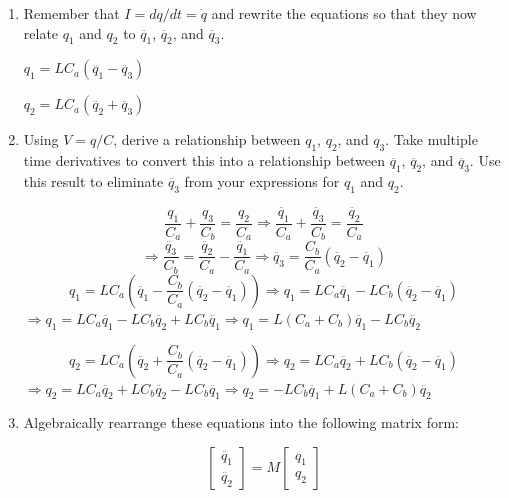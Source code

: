 \documentclass[fleqn]{article}
\makeatletter
\newenvironment{equationCenter}{\@fleqnfalse\begin{equation*}}{\end{equation*}}
\makeatother
\begin{document}
\begin{enumerate}[nolistsep]
\begin{enumerate}[nolistsep]
				\item Remember that $I=dq/dt=\dot{q}$ and rewrite the equations so that they now relate $q_1$ and $q_2$ to $\ddot{q_1}$, $\ddot{q_2}$, and $\ddot{q_3}$.
				
					$q_1 = LC_a(\ddot{q_1} - \ddot{q_3})$
					
					$q_2 = LC_a(\ddot{q_2} + \ddot{q_3})$
					
				\item Using $V=q/C$, derive a relationship between $q_1$, $q_2$, and $q_3$. Take multiple time derivatives to convert this into a relationship between $\ddot{q_1}$, $\ddot{q_2}$, and $\ddot{q_3}$. Use this result to eliminate $\ddot{q_3}$ from your expressions for $q_1$ and $q_2$.
				
					\begin{equation*}
						\frac{q_1}{C_a} + \frac{q_3}{C_b} = \frac{q_2}{C_a} \Rightarrow \frac{\ddot{q_1}}{C_a} + \frac{\ddot{q_3}}{C_b} = \frac{\ddot{q_2}}{C_a}
					\end{equation*}
					\begin{equation*}
						 \Rightarrow \frac{\ddot{q_3}}{C_b} = \frac{\ddot{q_2}}{C_a} - \frac{\ddot{q_1}}{C_a} \Rightarrow \ddot{q_3} = \frac{C_b}{C_a}(\ddot{q_2} - \ddot{q_1})
					\end{equation*}
					\begin{equation*}
						q_1 = LC_a\left(\ddot{q_1} - \frac{C_b}{C_a}(\ddot{q_2} - \ddot{q_1})\right) \Rightarrow q_1 = LC_a\ddot{q_1} - LC_b(\ddot{q_2} - \ddot{q_1})
					\end{equation*}
					$\Rightarrow q_1 = LC_a\ddot{q_1} - LC_b\ddot{q_2} + LC_b\ddot{q_1} \Rightarrow q_1 = L(C_a + C_b)\ddot{q_1} - LC_b\ddot{q_2}$
					
					\begin{equation*}
						q_2 = LC_a\left(\ddot{q_2} + \frac{C_b}{C_a}(\ddot{q_2} - \ddot{q_1})\right) \Rightarrow q_2 = LC_a\ddot{q_2} + LC_b(\ddot{q_2} - \ddot{q_1})
					\end{equation*}
					$\Rightarrow q_2 = LC_a\ddot{q_2} + LC_b\ddot{q_2} - LC_b\ddot{q_1} \Rightarrow q_2 = - LC_b\ddot{q_1} + L(C_a + C_b)\ddot{q_2}$
					
				\item Algebraically rearrange these equations into the following matrix form:
				
					\begin{equationCenter}
						\begin{bmatrix}\ddot{q_1} \\ \ddot{q_2}\end{bmatrix} = M \begin{bmatrix}q_1 \\ q_2\end{bmatrix}
					\end{equationCenter}
					

\end{enumerate}
\end{enumerate}
\end{document}
